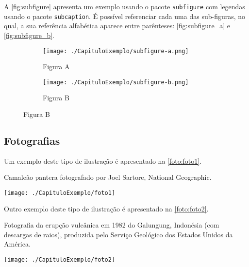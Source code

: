 A \autoref{fig:subfigure} apresenta um exemplo usando o pacote \texttt{subfigure} com legendas usando o pacote \texttt{subcaption}. É  possível referenciar cada uma das sub-figuras, no qual, a sua referência alfabética aparece entre parênteses: \autoref{fig:subfigure_a} e \autoref{fig:subfigure_b}.

\begin{figure}[!ht]
\centering
\caption{Exemplo de Subfigure} 
\label{fig:subfigure}
\begin{subfigure}[t]{.45\textwidth}
	\centering
	\texttt{[image: ./CapituloExemplo/subfigure-a.png]}
	\caption{Figura A}
	\label{fig:subfigure_a}
\end{subfigure}
\qquad
\begin{subfigure}[t]{.45\textwidth}
	\centering
	\texttt{[image: ./CapituloExemplo/subfigure-b.png]}  
	\caption{Figura B}
	\label{fig:subfigure_b}
\end{subfigure}
\end{figure}

\subsection{Fotografias}\label{sec:fotografias}

Um exemplo deste tipo de ilustração é apresentado na \autoref{foto:foto1}.

\begin{photograph}[htb]%
\captionsetup{width=0.6\textwidth}%
\caption{Camaleão pantera fotografado por Joel Sartore, National Geographic.}%
\label{foto:foto1}%
\texttt{[image: ./CapituloExemplo/foto1]}%
\end{photograph}

Outro exemplo deste tipo de ilustração é apresentado na \autoref{foto:foto2}.

\begin{photograph}[htb]%
\captionsetup{width=0.6\textwidth}%
\caption{Fotografia da erupção vulcânica em 1982 do Galungung, Indonésia (com descargas de raios), produzida pelo Serviço Geológico dos Estados Unidos da América.}%
\label{foto:foto2}%
\texttt{[image: ./CapituloExemplo/foto2]}%
\end{photograph}


